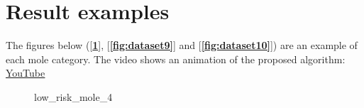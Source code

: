 \documentclass[12pt]{report}
\begin{document}
\pagebreak


\section{Result examples}
The figures below ([\textbf{\ref{fig:dataset8}}], [\textbf{\ref{fig:dataset9}}] and [\textbf{\ref{fig:dataset10}}]) are an example of each mole category.
The video shows an animation of the proposed algorithm: \href{https://youtu.be/jqscD-K-eMs}{\underline{YouTube}} 

\begin{figure}[H]
\centering
{}
\qquad
{}
\qquad
{}
\qquad
{}
\caption{low\_risk\_mole\_4}
\label{fig:dataset8}


\end{figure}
\end{document}
